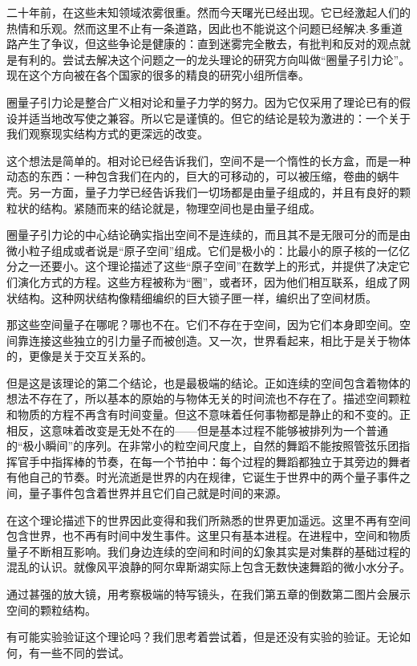    二十年前，在这些未知领域浓雾很重。然而今天曙光已经出现。它已经激起人们的热情和乐观。然而这里不止有一条道路，因此也不能说这个问题已经解决.多重道路产生了争议，但这些争论是健康的：直到迷雾完全散去，有批判和反对的观点就是有利的。尝试去解决这个问题之一的龙头理论的研究方向叫做“圈量子引力论”。现在这个方向被在各个国家的很多的精良的研究小组所信奉。

   圈量子引力论是整合广义相对论和量子力学的努力。因为它仅采用了理论已有的假设并适当地改写使之兼容。所以它是谨慎的。但它的结论是较为激进的：一个关于我们观察现实结构方式的更深远的改变。

   这个想法是简单的。相对论已经告诉我们，空间不是一个惰性的长方盒，而是一种动态的东西：一种包含我们在内的，巨大的可移动的，可以被压缩，卷曲的蜗牛壳。另一方面，量子力学已经告诉我们一切场都是由量子组成的，并且有良好的颗粒状的结构。紧随而来的结论就是，物理空间也是由量子组成。

   圈量子引力论的中心结论确实指出空间不是连续的，而且其不是无限可分的而是由微小粒子组成或者说是“原子空间”组成。它们是极小的：比最小的原子核的一亿亿分之一还要小。这个理论描述了这些“原子空间”在数学上的形式，并提供了决定它们演化方式的方程。这些方程被称为“圈”，或者环，因为他们相互联系，组成了网状结构。这种网状结构像精细编织的巨大锁子匣一样，编织出了空间材质。

   那这些空间量子在哪呢？哪也不在。它们不存在于空间，因为它们本身即空间。空间靠连接这些独立的引力量子而被创造。又一次，世界看起来，相比于是关于物体的，更像是关于交互关系的。

   但是这是该理论的第二个结论，也是最极端的结论。正如连续的空间包含着物体的想法不存在了，所以基本的原始的与物体无关的时间流也不存在了。描述空间颗粒和物质的方程不再含有时间变量。但这不意味着任何事物都是静止的和不变的。正相反，这意味着改变是无处不在的——但是基本过程不能够被排列为一个普通的“极小瞬间”的序列。在非常小的粒空间尺度上，自然的舞蹈不能按照管弦乐团指挥官手中指挥棒的节奏，在每一个节拍中：每个过程的舞蹈都独立于其旁边的舞者有他自己的节奏。时光流逝是世界的内在规律，它诞生于世界中的两个量子事件之间，量子事件包含着世界并且它们自己就是时间的来源。

   在这个理论描述下的世界因此变得和我们所熟悉的世界更加遥远。这里不再有空间包含世界，也不再有时间中发生事件。这里只有基本进程。在进程中，空间和物质量子不断相互影响。我们身边连续的空间和时间的幻象其实是对集群的基础过程的混乱的认识。就像风平浪静的阿尔卑斯湖实际上包含无数快速舞蹈的微小水分子。

   通过甚强的放大镜，用考察极端的特写镜头，在我们第五章的倒数第二图片会展示空间的颗粒结构。

   有可能实验验证这个理论吗？我们思考着尝试着，但是还没有实验的验证。无论如何，有一些不同的尝试。

